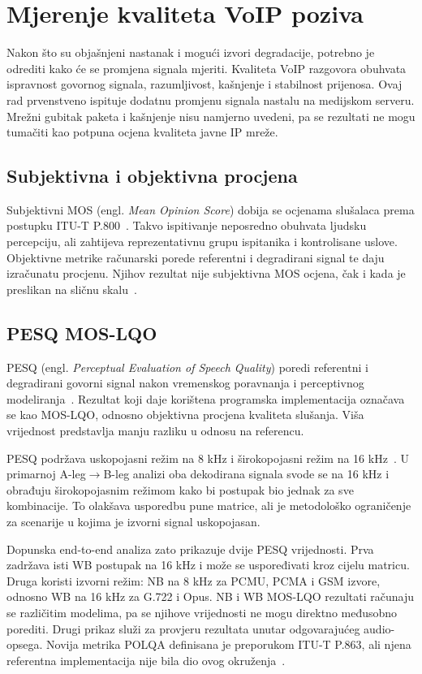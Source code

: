 \chapter{Mjerenje kvaliteta VoIP poziva}
\label{ch:kvaliteta}

Nakon što su objašnjeni nastanak i mogući izvori degradacije, potrebno je odrediti kako će se promjena signala mjeriti. Kvaliteta VoIP razgovora obuhvata ispravnost govornog signala, razumljivost, kašnjenje i stabilnost prijenosa. Ovaj rad prvenstveno ispituje dodatnu promjenu signala nastalu na medijskom serveru. Mrežni gubitak paketa i kašnjenje nisu namjerno uvedeni, pa se rezultati ne mogu tumačiti kao potpuna ocjena kvaliteta javne IP mreže.

\section{Subjektivna i objektivna procjena}

Subjektivni MOS (engl. \emph{Mean Opinion Score}) dobija se ocjenama slušalaca prema postupku ITU-T P.800~\cite{itu-p800}. Takvo ispitivanje neposredno obuhvata ljudsku percepciju, ali zahtijeva reprezentativnu grupu ispitanika i kontrolisane uslove. Objektivne metrike računarski porede referentni i degradirani signal te daju izračunatu procjenu. Njihov rezultat nije subjektivna MOS ocjena, čak i kada je preslikan na sličnu skalu~\cite{tandem-encoding}.

\section{PESQ MOS-LQO}

PESQ (engl. \emph{Perceptual Evaluation of Speech Quality}) poredi referentni i degradirani govorni signal nakon vremenskog poravnanja i perceptivnog modeliranja~\cite{rix-pesq,itu-p862}. Rezultat koji daje korištena programska implementacija označava se kao MOS-LQO, odnosno objektivna procjena kvaliteta slušanja. Viša vrijednost predstavlja manju razliku u odnosu na referencu.

PESQ podržava uskopojasni režim na 8 kHz i širokopojasni režim na 16 kHz~\cite{itu-p862,itu-p862-2}. U primarnoj A-leg$\rightarrow$B-leg analizi oba dekodirana signala svode se na 16 kHz i obrađuju širokopojasnim režimom kako bi postupak bio jednak za sve kombinacije. To olakšava usporedbu pune matrice, ali je metodološko ograničenje za scenarije u kojima je izvorni signal uskopojasan.

Dopunska end-to-end analiza zato prikazuje dvije PESQ vrijednosti. Prva zadržava isti WB postupak na 16 kHz i može se uspoređivati kroz cijelu matricu. Druga koristi izvorni režim: NB na 8 kHz za PCMU, PCMA i GSM izvore, odnosno WB na 16 kHz za G.722 i Opus. NB i WB MOS-LQO rezultati računaju se različitim modelima, pa se njihove vrijednosti ne mogu direktno međusobno porediti. Drugi prikaz služi za provjeru rezultata unutar odgovarajućeg audio-opsega. Novija metrika POLQA definisana je preporukom ITU-T P.863, ali njena referentna implementacija nije bila dio ovog okruženja~\cite{itu-p863}.

